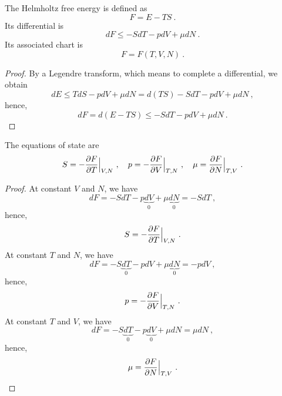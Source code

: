     The Helmholtz free energy is defined as 
    \begin{equation}\label{td:def:f}
        F = E - TS ~.
    \end{equation}
    Its differential is 
    \begin{equation}\label{td:d:f}
        dF \leq - S dT - p dV + \mu dN ~.
    \end{equation}
    Its associated chart is
    \begin{equation}\label{td:coord:f}
        F = F(T, V, N) ~.
    \end{equation}
    \begin{proof}
        By a Legendre transform, which means to complete a differential, we obtain
        \begin{equation*}
            dE \leq T dS - p dV + \mu dN = d(TS) - S dT - p dV + \mu dN ~,
        \end{equation*}
        hence,
        \begin{equation*}
            dF = d(E - TS) \leq - S dT - p dV + \mu dN ~.
        \end{equation*}
    \end{proof}
    The equations of state are
    \begin{equation}\label{td:es:f}
        S = - \frac{\partial F}{\partial T} \Big \vert_{V,N} ~, \quad p = - \frac{\partial F}{\partial V} \Big \vert_{T,N} ~, \quad \mu = \frac{\partial F}{\partial N} \Big \vert_{T,V} ~. 
    \end{equation}
    \begin{proof}
        At constant $V$ and $N$, we have
        \begin{equation*}
            dF = - S dT - p \underbrace{dV}_0 + \mu \underbrace{dN}_0 = - S dT~,
        \end{equation*}
        hence,
        \begin{equation*}
            S = - \frac{\partial F}{\partial T} \Big \vert_{V,N} ~.
        \end{equation*}
        At constant $T$ and $N$, we have
        \begin{equation*}
            dF = - S \underbrace{dT}_0 - p dV + \mu \underbrace{dN}_0 = - pdV ~,
        \end{equation*}
        hence,
        \begin{equation*}
            p = - \frac{\partial F}{\partial V} \Big \vert_{T,N} ~.
        \end{equation*}
        At constant $T$ and $V$, we have
        \begin{equation*}
            dF = - S \underbrace{dT}_0 - p \underbrace{dV}_0 + \mu dN = \mu dN~,
        \end{equation*}
        hence,
        \begin{equation*}
            \mu = \frac{\partial F}{\partial N} \Big \vert_{T,V} ~.
        \end{equation*}
    \end{proof}
